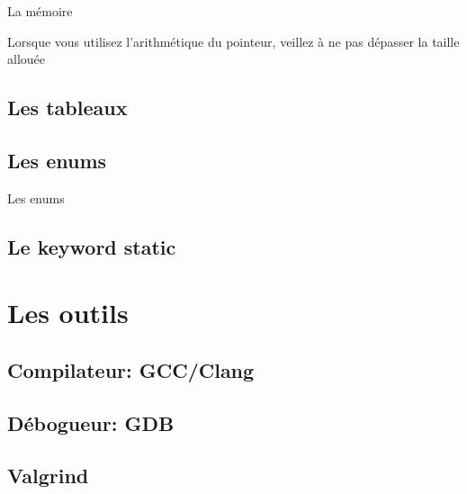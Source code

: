 \documentclass{beamer}
\begin{document}
\begin{darkframes}
\begin{frame}{La mémoire}
  		\begin{alertblock}{Lorsque vous utilisez l'arithmétique du pointeur, veillez à ne pas dépasser la taille allouée}
  		\end{alertblock}
  	\end{frame}
  	
  	\subsection{Les tableaux}
  	
  	\subsection{Les enums}
  		\begin{frame}{Les enums}
  	\end{frame}
  	
  	\subsection{Le keyword static}
  	
  	\section{Les outils}
  	\subsection{Compilateur: GCC/Clang}
  	\subsection{Débogueur: GDB}
  	\subsection{Valgrind}
  	
  \end{darkframes}
\end{document}
